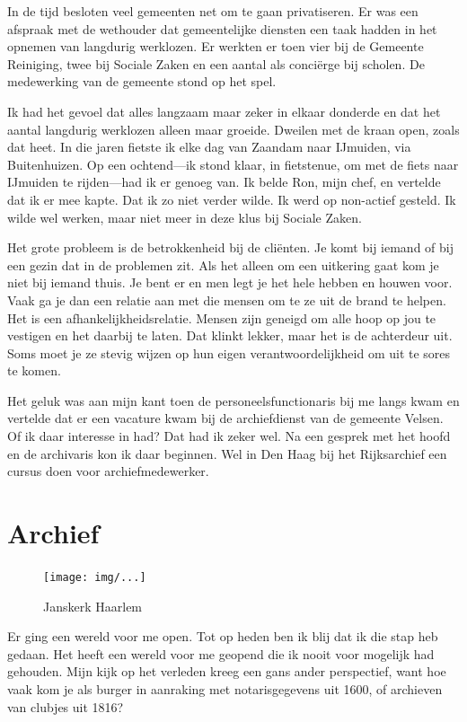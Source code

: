 \documentclass[12pt,twoside, openright]{memoir}
\begin{document}
In de tijd besloten veel gemeenten net om te gaan privatiseren. Er was een afspraak met de wethouder dat gemeentelijke diensten een taak hadden in het opnemen van langdurig werklozen. Er werkten er toen vier bij de Gemeente Reiniging, twee bij Sociale Zaken en een aantal als conciërge bij scholen. De medewerking van de gemeente stond op het spel. 

Ik had het gevoel dat alles langzaam maar zeker in elkaar donderde en dat het aantal langdurig werklozen alleen maar groeide. Dweilen met de kraan open, zoals dat heet. In die jaren fietste ik elke dag van Zaandam naar IJmuiden, via Buitenhuizen. Op een ochtend---ik stond klaar, in fietstenue, om met de fiets naar IJmuiden te rijden---had ik er genoeg van. Ik belde Ron, mijn chef, en vertelde dat ik er mee kapte. Dat ik zo niet verder wilde. Ik werd op non-actief gesteld. Ik wilde wel werken, maar niet meer in deze klus bij Sociale Zaken.

Het grote probleem is de betrokkenheid bij de cliënten. Je komt bij iemand of bij een gezin dat in de problemen zit. Als het alleen om een uitkering gaat kom je niet bij iemand thuis. Je bent er en men legt je het hele hebben en houwen voor. Vaak ga je dan een relatie aan met die mensen om te ze uit de brand te helpen. Het is een afhankelijkheidsrelatie. Mensen zijn geneigd om alle hoop op jou te vestigen en het daarbij te laten. Dat klinkt lekker, maar het is de achterdeur uit. Soms moet je ze stevig wijzen op hun eigen verantwoordelijkheid om uit te sores te komen. 

Het geluk was aan mijn kant toen de personeelsfunctionaris bij me langs kwam en vertelde dat er een vacature kwam bij de archiefdienst van de gemeente Velsen. Of ik daar interesse in had? Dat had ik zeker wel. Na een gesprek met het hoofd en de archivaris kon ik daar beginnen. Wel in Den Haag bij het Rijksarchief een cursus doen voor archiefmedewerker. 

\chapter{Archief} %
\label{cha:archief}

\begin{figure}[t]
\texttt{[image: img/...]}
\caption{Janskerk Haarlem}
\end{figure}

Er ging een wereld voor me open. Tot op heden ben ik blij dat ik die stap heb gedaan. Het heeft een wereld voor me geopend die ik nooit voor mogelijk had gehouden. Mijn kijk op het verleden kreeg een gans ander perspectief, want hoe vaak kom je als burger in aanraking met notarisgegevens uit 1600, of archieven van clubjes uit 1816?
\end{document}
